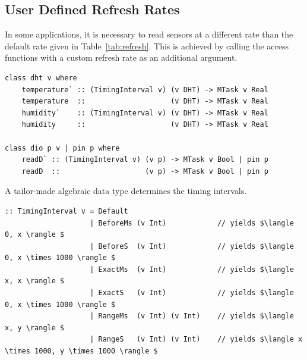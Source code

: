 \documentclass[runningheads]{llncs}
\newcommand{\CleanInline}[1]{\lstinline[language=Clean]!#1!}
\newcommand{\prog}[1]{\CleanInline{#1}}
\begin{document}





\subsection{User Defined Refresh Rates}

In some applications, it is necessary to read sensors at a different rate than the default rate given in Table~\ref{tab:refresh}.
This is achieved by calling the access functions with a custom refresh rate as an additional argument.

\begin{lstlisting}[language=Clean,caption={Definition for DHT sensors and reading digital values from GPIO pins with a custom timing interval.},label={lst:dht}]
class dht v where
    temperature` :: (TimingInterval v) (v DHT) -> MTask v Real
    temperature  ::                    (v DHT) -> MTask v Real
    humidity`    :: (TimingInterval v) (v DHT) -> MTask v Real
    humidity     ::                    (v DHT) -> MTask v Real

class dio p v | pin p where
    readD` :: (TimingInterval v) (v p) -> MTask v Bool | pin p
    readD  ::                    (v p) -> MTask v Bool | pin p
\end{lstlisting}

A tailor-made algebraic data type determines the timing intervals.

\begin{lstlisting}[language=Clean,caption={The ADT for timing intervals in mTask.},label={lst:interval}]
:: TimingInterval v = Default
                    | BeforeMs (v Int)            // yields $\langle 0, x \rangle $
                    | BeforeS  (v Int)            // yields $\langle 0, x \times 1000 \rangle $
                    | ExactMs  (v Int)            // yields $\langle x, x \rangle $
                    | ExactS   (v Int)            // yields $\langle 0, x \times 1000 \rangle $
                    | RangeMs  (v Int) (v Int)    // yields $\langle x, y \rangle $
                    | RangeS   (v Int) (v Int)    // yields $\langle x \times 1000, y \times 1000 \rangle $
\end{lstlisting}
\end{document}
